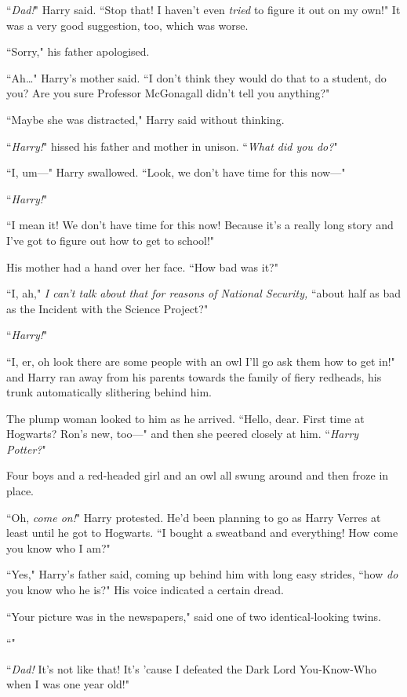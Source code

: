``\emph{Dad!}" Harry said. ``Stop that! I haven't even \emph{tried} to figure it out on my own!" It was a very good suggestion, too, which was worse.

``Sorry," his father apologised.

``Ah…" Harry's mother said. ``I don't think they would do that to a student, do you? Are you sure Professor McGonagall didn't tell you anything?"

``Maybe she was distracted," Harry said without thinking.

``\emph{Harry!}" hissed his father and mother in unison. ``\emph{What did you do?}"

``I, um—" Harry swallowed. ``Look, we don't have time for this now—"

``\emph{Harry!}"

``I mean it! We don't have time for this now! Because it's a really long story and I've got to figure out how to get to school!"

His mother had a hand over her face. ``How bad was it?"

``I, ah," \emph{I can't talk about that for reasons of National Security,} ``about half as bad as the Incident with the Science Project?"

``\emph{Harry!}"

``I, er, oh look there are some people with an owl I'll go ask them how to get in!" and Harry ran away from his parents towards the family of fiery redheads, his trunk automatically slithering behind him.

The plump woman looked to him as he arrived. ``Hello, dear. First time at Hogwarts? Ron's new, too—" and then she peered closely at him. ``\emph{Harry Potter?}"

Four boys and a red-headed girl and an owl all swung around and then froze in place.

``Oh, \emph{come on!}" Harry protested. He'd been planning to go as Harry Verres at least until he got to Hogwarts. ``I bought a sweatband and everything! How come you know who I am?"

``Yes," Harry's father said, coming up behind him with long easy strides, ``how \emph{do} you know who he is?" His voice indicated a certain dread.

``Your picture was in the newspapers," said one of two identical-looking twins.

``"

``\emph{Dad!} It's not like that! It's 'cause I defeated the Dark Lord You-Know-Who when I was one year old!"

